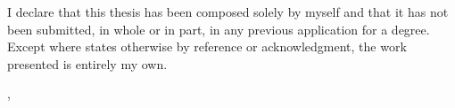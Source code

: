 \thispagestyle{empty}
\vspace*{0.76\textheight}
\noindent
I declare that this thesis has been composed solely by myself and that it has not been submitted, in whole or in part, in any previous application for a degree. Except where states otherwise by reference or acknowledgment, the work presented is entirely my own.

\vspace{13mm}
\noindent
\getSubmissionLocation{}, \getSubmissionDate{} \hspace{50mm} \getAuthor{}

\cleardoublepage{}
